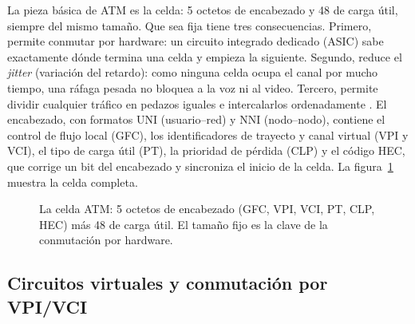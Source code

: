 \documentclass[12pt,a4paper]{article}
\begin{document}
La pieza básica de ATM es la celda: 5 octetos de encabezado y 48 de carga útil, siempre del mismo tamaño. Que sea fija tiene tres consecuencias. Primero, permite conmutar por hardware: un circuito integrado dedicado (ASIC) sabe exactamente dónde termina una celda y empieza la siguiente. Segundo, reduce el \emph{jitter} (variación del retardo): como ninguna celda ocupa el canal por mucho tiempo, una ráfaga pesada no bloquea a la voz ni al video. Tercero, permite dividir cualquier tráfico en pedazos iguales e intercalarlos ordenadamente \cite{itui361, deprycker1995}. El encabezado, con formatos UNI (usuario--red) y NNI (nodo--nodo), contiene el control de flujo local (GFC), los identificadores de trayecto y canal virtual (VPI y VCI), el tipo de carga útil (PT), la prioridad de pérdida (CLP) y el código HEC, que corrige un bit del encabezado y sincroniza el inicio de la celda. La figura~\ref{fig:celda} muestra la celda completa.

\begin{figure}[h]
    \centering
    \caption{La celda ATM: 5 octetos de encabezado (GFC, VPI, VCI, PT, CLP, HEC) más 48 de carga útil. El tamaño fijo es la clave de la conmutación por hardware.}
    \label{fig:celda}
\end{figure}

\subsection{Circuitos virtuales y conmutación por VPI/VCI}
\end{document}
